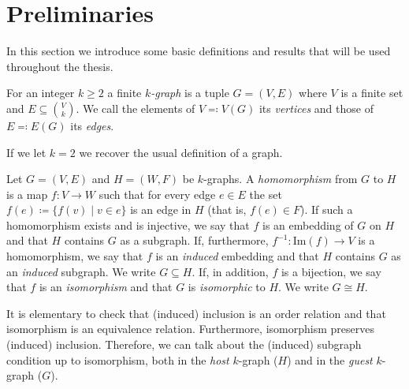 \section{Preliminaries}\label{sec:preliminaries}
In this section we introduce some basic definitions and results that will be used throughout the thesis.

\begin{definition}

    For an integer $k \geq 2$ a finite \emph{$k$-graph}
    is a tuple $G = (V, E)$ where $V$ is a finite set
    and $E \subseteq \binom{V}{k}$.
    We call the elements of $V \eqqcolon V(G)$ its \emph{vertices}
    and those of $E \eqqcolon E(G)$ its \emph{edges}.
\end{definition}

\begin{remark}
    If we let $k=2$ we recover the usual definition of a graph.
\end{remark}


\begin{definition}
    Let $G = (V, E)$ and $H = (W, F)$ be $k$-graphs.
    A \emph{homomorphism} from $G$ to $H$ is a map $f: V \to W$
    such that for every edge $e \in E$ the set $f(e) \coloneqq \{f(v) \mid v \in e\}$
    is an edge in $H$ (that is, $f(e) \in F$). If such a homomorphism exists
    and is injective, we say that $f$ is an embedding of $G$ on $H$
    and that $H$ contains $G$ as a subgraph.
    If, furthermore, $f^{-1}: \text{Im}(f) \to V$ is a homomorphism, we say that $f$
    is an \emph{induced} embedding and that $H$ contains $G$ as an \emph{induced}
    subgraph.
    We write $G \subseteq H$.
    If, in addition, $f$ is a bijection, we say that $f$ is an \emph{isomorphism}
    and that $G$ is \emph{isomorphic} to $H$.
    We write $G \cong H$.
\end{definition}

\begin{remark} %

    It is elementary to check that
    (induced) inclusion is an order relation and that
    isomorphism is an equivalence relation.
    Furthermore, isomorphism preserves (induced) inclusion.
    Therefore, we can talk about the (induced) subgraph
    condition up to isomorphism, both in the \emph{host} $k$-graph
    ($H$) and in the \emph{guest} $k$-graph ($G$).
\end{remark}

